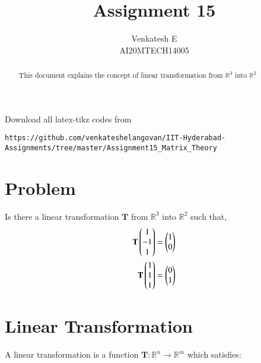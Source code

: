 \documentclass[journal,12pt,twocolumn]{IEEEtran}
\begin{document}
\makeatletter
{}
\makeatother
\let\StandardTheFigure\thefigure
\let\vec\mathbf
\renewcommand{\thefigure}{\theproblem}
\def\putbox#1#2#3{\makebox[0in][l]{\makebox[#1][l]{}\raisebox{\baselineskip}[0in][0in]{\raisebox{#2}[0in][0in]{#3}}}}
     \def\rightbox#1{\makebox[0in][r]{#1}}
     \def\centbox#1{\makebox[0in]{#1}}
     \def\topbox#1{\raisebox{-\baselineskip}[0in][0in]{#1}}
     \def\midbox#1{\raisebox{-0.5\baselineskip}[0in][0in]{#1}}
\vspace{3cm}
\title{Assignment 15}
\author{Venkatesh E\\AI20MTECH14005}
\maketitle
\newpage
\bigskip
\renewcommand{\thefigure}{\theenumi}
\renewcommand{\thetable}{\theenumi}
\begin{abstract}
This document explains the concept of linear transformation from $\mathbb{R}^3$ into $\mathbb{R}^2$
\end{abstract}
Download all latex-tikz codes from 
%
\begin{lstlisting}
https://github.com/venkateshelangovan/IIT-Hyderabad-Assignments/tree/master/Assignment15_Matrix_Theory
\end{lstlisting}
\section{Problem}
 Is there a linear transformation $\vec{T}$ from $\mathbb{R}^3$ into $\mathbb{R}^2$ such that,
 \begin{align}
 \vec{T}\myvec{1\\ -1\\ 1} & = \myvec{1\\0}\label{g1}\\
 \vec{T}\myvec{1\\ 1\\1} &= \myvec{0\\ 1}\label{g2}
 \end{align}
 \section{Linear Transformation}
 A linear transformation is a function $\vec{T} :\mathbb{R}^n \rightarrow  \mathbb{R}^m$ which satisfies:
 
\end{document}
